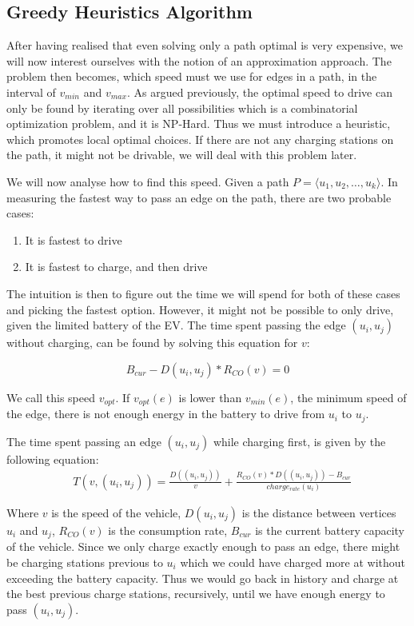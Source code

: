 \subsection{Greedy Heuristics Algorithm}
After having realised that even solving only a path optimal is very expensive, we will now interest ourselves with the notion of an approximation approach. The problem then becomes, which speed must we use for edges in a path, in the interval of $v_{min}$ and $v_{max}$. As argued previously, the optimal speed to drive can only be found by iterating over all possibilities which is a combinatorial optimization problem, and it is NP-Hard. Thus we must introduce a heuristic, which promotes local optimal choices. If there are not any charging stations on the path, it might not be drivable, we will deal with this problem later.

We will now analyse how to find this speed. Given a path $P = \langle u_1,u_2,\dots,u_k \rangle$. In measuring the fastest way to pass an edge on the path, there are two probable cases:
\begin{enumerate}
	\item It is fastest to drive
	\item It is fastest to charge, and then drive
\end{enumerate}

The intuition is then to figure out the time we will spend for both of these cases and picking the fastest option. However, it might not be possible to only drive, given the limited battery of the EV. The time spent passing the edge $(u_i, u_j)$ without charging, can be found by solving this equation for $v$:

\[B_{cur} - D(u_i, u_j) * R_{CO}(v) = 0\] 

We call this speed $v_{opt}$. If $v_{opt}(e)$ is lower than $v_{min}(e)$, the minimum speed of the edge, there is not enough energy in the battery to drive from $u_i$ to $u_j$. 

The time spent passing an edge $(u_i, u_j)$ while charging first, is given by the following equation:
\begin{equation*}
\begin{aligned}
 & T(v,(u_i, u_j)) = \frac{D((u_i, u_j))}{v} + \frac{R_{CO}(v) * D((u_i, u_j)) - B_{cur}}{charge_{rate}(u_i)}
\end{aligned}
\end{equation*}\label{eq:drivingAndCharging}


Where $v$ is the speed of the vehicle, $D(u_i, u_j)$ is the distance between vertices $u_i$ and $u_j$, $R_{CO}(v)$ is the consumption rate, $B_{cur}$ is the current battery capacity of the vehicle. Since we only charge exactly enough to pass an edge, there might be charging stations previous to $u_i$ which we could have charged more at without exceeding the battery capacity. Thus we would go back in history and charge at the best previous charge stations, recursively, until we have enough energy to pass $(u_i, u_j)$.

